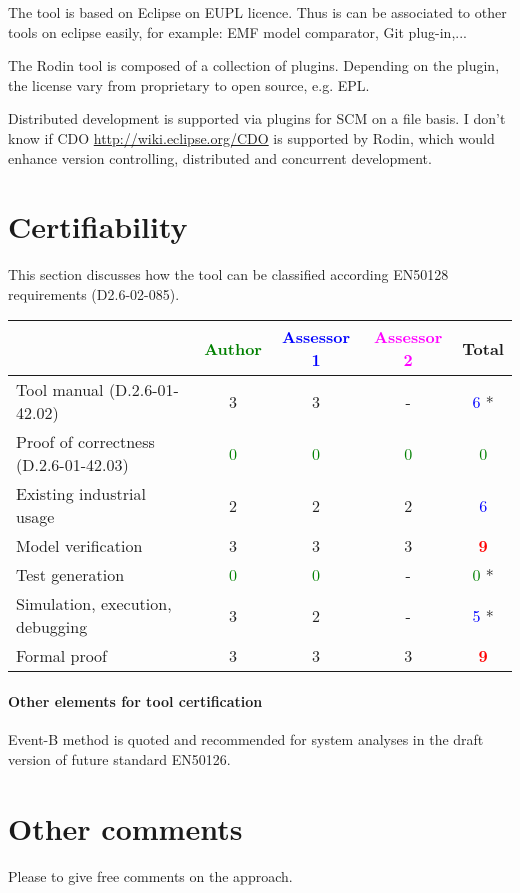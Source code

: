 \begin{author_comment}
The tool is based on Eclipse on EUPL licence. Thus is can be associated to  other tools on eclipse easily, for example: EMF model comparator, Git plug-in,...
\end{author_comment}

\begin{assessor2}
  The Rodin tool is composed of a collection of plugins. Depending on
  the plugin, the license vary from proprietary to open source,
  e.g. EPL.
\end{assessor2}

\begin{assessor2}
  Distributed development is supported via plugins for SCM on a file
  basis. I don't know if CDO \url{http://wiki.eclipse.org/CDO} is
  supported by Rodin, which would enhance version controlling,
  distributed and concurrent development.
\end{assessor2}

\section{Certifiability}

This section discusses how the tool can be classified according EN50128 requirements (D2.6-02-085).


\begin{tabular}{|l | c | c | c | c|}
\hline
& \textcolor{green}{Author} & \textcolor{blue}{Assessor 1} & \textcolor{magenta}{Assessor 2} & Total \\
\hline 
Tool manual (D.2.6-01-42.02) & 3    & 3    & - & \textcolor{blue}{6} *  \\
\hline
Proof of correctness (D.2.6-01-42.03)   & \textcolor{green}{0} & \textcolor{green}{0} & \textcolor{green}{0} & \textcolor{green}{0} \\
\hline
Existing industrial usage  & 2    & 2    & 2    & \textcolor{blue}{6} \\
\hline
Model verification & 3    & 3    & 3    & \textcolor{red}{\textbf{9}} \\
\hline
Test generation & \textcolor{green}{0} & \textcolor{green}{0} & - & \textcolor{green}{0} * \\
\hline
Simulation, execution, debugging & 3    & 2    & - & \textcolor{blue}{5} * \\
\hline
Formal proof &3  & 3    & 3    & \textcolor{red}{\textbf{9}} \\
\hline
\end{tabular}

\paragraph{Other elements for tool certification}

\begin{author_comment}
Event-B method is quoted and recommended for system analyses in the draft version of future standard EN50126.

\end{author_comment}

\section{Other comments}
Please to  give free comments on the approach.



